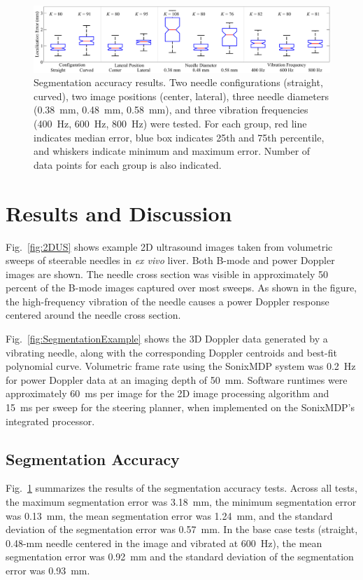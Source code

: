 \begin{figure}[!t]
\centering
\includegraphics[width=\textwidth]{Images/Chapter2/SegmentationAccuracy/SegmentationAccuracy}%
\caption{Segmentation accuracy results. Two needle configurations (straight, curved), two image positions (center, lateral), three needle diameters (0.38~mm, 0.48~mm, 0.58~mm), and three vibration frequencies (400~Hz, 600~Hz, 800~Hz) were tested. For each group, red line indicates median error, blue box indicates 25th and 75th percentile, and whiskers indicate minimum and maximum error. Number of data points for each group is also indicated.}
\label{fig:SegmentationError}
\end{figure}

\section{Results and Discussion}
\label{sec:Results}
Fig.~\ref{fig:2DUS} shows example 2D ultrasound images taken from volumetric sweeps of steerable needles in \textit{ex vivo} liver. Both B-mode and power Doppler images are shown. The needle cross section was visible in approximately 50 percent of the B-mode images captured over most sweeps. As shown in the figure, the high-frequency vibration of the needle causes a power Doppler response centered around the needle cross section.

Fig.~\ref{fig:SegmentationExample} shows the 3D Doppler data generated by a vibrating needle, along with the corresponding Doppler centroids and best-fit polynomial curve. Volumetric frame rate using the SonixMDP system was 0.2~Hz for power Doppler data at an imaging depth of 50~mm. Software runtimes were approximately 60~ms per image for the 2D image processing algorithm and 15~ms per sweep for the steering planner, when implemented on the SonixMDP's integrated processor.

\subsection{Segmentation Accuracy}
Fig.~\ref{fig:SegmentationError} summarizes the results of the segmentation accuracy tests. Across all tests, the maximum segmentation error was 3.18~mm, the minimum segmentation error was 0.13~mm, the mean segmentation error was 1.24~mm, and the standard deviation of the segmentation error was 0.57~mm. In the base case tests (straight, 0.48-mm needle centered in the image and vibrated at 600~Hz), the mean segmentation error was 0.92~mm and the standard deviation of the segmentation error was 0.93~mm.

